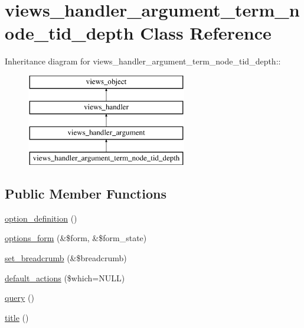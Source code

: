 \hypertarget{classviews__handler__argument__term__node__tid__depth}{
\section{views\_\-handler\_\-argument\_\-term\_\-node\_\-tid\_\-depth Class Reference}
\label{classviews__handler__argument__term__node__tid__depth}
}
Inheritance diagram for views\_\-handler\_\-argument\_\-term\_\-node\_\-tid\_\-depth::\begin{figure}[H]
\begin{center}
\leavevmode
\includegraphics[height=4cm]{classviews__handler__argument__term__node__tid__depth}
\end{center}
\end{figure}
\subsection*{Public Member Functions}
\begin{CompactItemize}
\item 
\hyperlink{classviews__handler__argument__term__node__tid__depth_e285fe11521bfb9a6cd4f79b498a28a7}{option\_\-definition} ()
\item 
\hyperlink{classviews__handler__argument__term__node__tid__depth_db15b091303182e330a162d384676e50}{options\_\-form} (\&\$form, \&\$form\_\-state)
\item 
\hyperlink{classviews__handler__argument__term__node__tid__depth_4cbf578a06b12655b9a5aa8fcee4097d}{set\_\-breadcrumb} (\&\$breadcrumb)
\item 
\hyperlink{classviews__handler__argument__term__node__tid__depth_507f5facd0421728d2d0a5f350839dfc}{default\_\-actions} (\$which=NULL)
\item 
\hyperlink{classviews__handler__argument__term__node__tid__depth_8956dffc5b8c1b5adef8cdc6e897c7ab}{query} ()
\item 
\hyperlink{classviews__handler__argument__term__node__tid__depth_d5a2ca190b4b164a810f84f808faa586}{title} ()
\end{CompactItemize}


